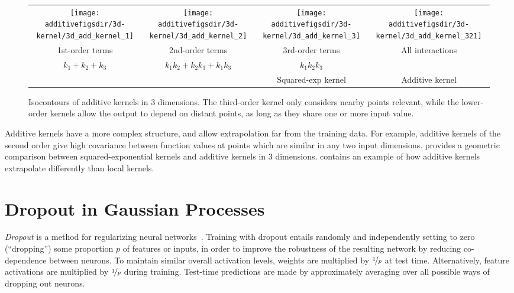 \begin{figure}[ht!]
\centering
\begin{tabular}{cccc}
\hspace{-0.1in}
 \texttt{[image: \\additivefigsdir/3d-kernel/3d\_add\_kernel\_1]} &
\hspace{-0.2in} \texttt{[image: \\additivefigsdir/3d-kernel/3d\_add\_kernel\_2]} &
\hspace{-0.2in} \texttt{[image: \\additivefigsdir/3d-kernel/3d\_add\_kernel\_3]} & 
\hspace{-0.2in} \texttt{[image: \\additivefigsdir/3d-kernel/3d\_add\_kernel\_321]}\\
1st-order terms &
2nd-order terms & 
3rd-order terms & 
All interactions \\
$k_1 + k_2 + k_3$ & $k_1k_2 + k_2k_3 + k_1k_3$ & $k_1k_2k_3$ & \\
& & Squared-exp kernel & Additive kernel\\
\end{tabular}
\caption[Isocontours of additive kernels in 3 dimensions]
{Isocontours of additive kernels in 3 dimensions.
The third-order kernel only considers nearby points relevant, while the lower-order kernels allow the output to depend on distant points, as long as they share one or more input value.}
\label{fig:kernels3d}
\end{figure}

Additive kernels have a more complex structure, and allow extrapolation far from the training data.
For example, additive kernels of the second order give high covariance between function values at points which are similar in any two input dimensions.
 provides a geometric comparison between squared-exponential kernels and additive kernels in 3 dimensions.
 contains an example of how additive kernels extrapolate differently than local kernels.





\section{Dropout in Gaussian Processes}

\emph{Dropout} is a method for regularizing neural networks~\citep{hinton2012improving, srivastava2013improving}.
Training with dropout entails randomly and independently setting to zero (``dropping'') some proportion $p$ of features or inputs, in order to improve the robustness of the resulting network by reducing co-dependence between neurons.
To maintain similar overall activation levels, weights are multiplied by $\nicefrac{1}{p}$ at test time. Alternatively, feature activations are multiplied by $\nicefrac{1}{p}$ during training.
Test-time predictions are made by approximately averaging over all possible ways of dropping out neurons.


